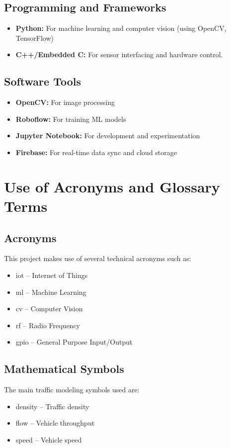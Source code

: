 \documentclass[12pt]{report}
\begin{document}
\subsection{Programming and Frameworks}
\begin{itemize}
    \item \textbf{Python:} For machine learning and computer vision (using OpenCV, TensorFlow)
    \item \textbf{C++/Embedded C:} For sensor interfacing and hardware control.
\end{itemize}

\subsection{Software Tools}
\begin{itemize}
    \item \textbf{OpenCV:} For image processing
    \item \textbf{Roboflow:} For training ML models
    \item \textbf{Jupyter Notebook:} For development and experimentation
    \item \textbf{Firebase:} For real-time data sync and cloud storage
\end{itemize}

\section{Use of Acronyms and Glossary Terms}

\subsection{Acronyms}
This project makes use of several technical acronyms such as:
\begin{itemize}
    \item \gls{iot} – Internet of Things
    \item \gls{ml} – Machine Learning
    \item \gls{cv} – Computer Vision
    \item \gls{rf} – Radio Frequency
    \item \gls{gpio} – General Purpose Input/Output
\end{itemize}

\subsection{Mathematical Symbols}
The main traffic modeling symbols used are:
\begin{itemize}
    \item \gls{density} – Traffic density
    \item \gls{flow} – Vehicle throughput
    \item \gls{speed} – Vehicle speed
\end{itemize}
\end{document}
